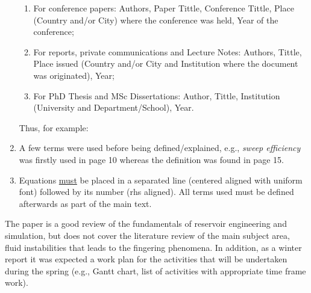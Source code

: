 \documentclass[14pt,twoside]{report}
\begin{document}
\begin{enumerate}
\begin{enumerate}
\item For conference papers: Authors, Paper Tittle, Conference Tittle, Place (Country and/or City) where the conference was held, Year of the conference;
\item For reports,  private communications and Lecture Notes: Authors, Tittle, Place issued (Country and/or City and Institution where the document was originated), Year;
\item For PhD Thesis and MSc Dissertations: Author, Tittle, Institution (University and Department/School), Year.
\end{enumerate}  
Thus, for example:
%
\item A few terms were used before being defined/explained, e.g., {\it sweep efficiency} was firstly used in page 10 whereas the definition was found in page 15. 
%
\item Equations \underline{must} be placed in a separated line (centered aligned with uniform font) followed by its number (rhs aligned). All terms used must be defined afterwards as part of the main text.
% 
\end{enumerate}

The paper is a good review of the fundamentals of reservoir engineering and simulation, but does not cover the literature review of the main subject area, fluid instabilities that leads to the fingering phenomena. In addition, as a winter report it was expected a work plan for the activities that will be undertaken during the spring (e.g., Gantt chart, list of activities with appropriate time frame work).
\end{document}
